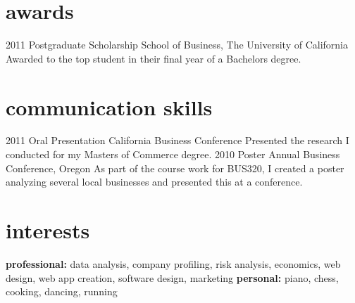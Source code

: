 \documentclass[]{friggeri-cv} %
\begin{document}

\section{awards}

\begin{entrylist}
\entry
{2011}
{Postgraduate Scholarship}
{School of Business, The University of California}
{Awarded to the top student in their final year of a Bachelors degree.}
\end{entrylist}


\section{communication skills}

\begin{entrylist}
\entry
{2011}
{Oral Presentation}
{California Business Conference}
{Presented the research I conducted for my Masters of Commerce degree.}
\entry
{2010}
{Poster}
{Annual Business Conference, Oregon}
{As part of the course work for BUS320, I created a poster analyzing several local businesses and presented this at a conference.}
\end{entrylist}


\section{interests}

\textbf{professional:} data analysis, company profiling, risk analysis, economics, web design, web app creation, software design, marketing \textbf{personal:} piano, chess, cooking, dancing, running
\end{document}
